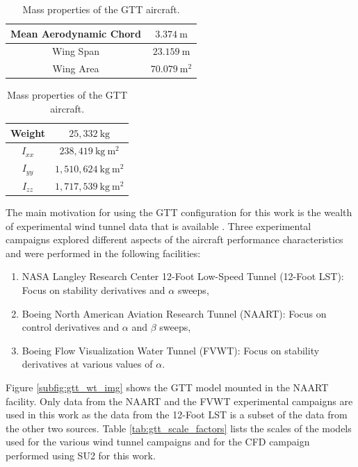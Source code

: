 \begin{table}
\parbox{0.5\textwidth}{
\centering
    \renewcommand{\arraystretch}{1.2}
    \captionsetup{justification=centering}
    \begin{tabular}{|c|c|}
        \hline
        Mean Aerodynamic Chord & $3.374~\mathrm{m}$ \\ \hline
        Wing Span & $23.159~\mathrm{m}$ \\ \hline
        Wing Area & $70.079~\mathrm{m^2}$ \\ \hline
    \end{tabular}
    \caption{Aerodynamic reference dimensions for the GTT aircraft.} 
    \label{tab:gtt_ref_dim}
}
\parbox{0.5\textwidth}{
\centering
    \renewcommand{\arraystretch}{1.2}
    \captionsetup{justification=centering}
    \begin{tabular}{|c|c|}
        \hline
        Weight & $25,332~\mathrm{kg}$ \\ \hline
        $I_{xx}$ & $238,419~\mathrm{kg~m^2}$ \\ \hline
        $I_{yy}$ & $1,510,624~\mathrm{kg~m^2}$ \\ \hline
        $I_{zz}$ & $1,717,539~\mathrm{kg~m^2}$ \\ \hline
    \end{tabular}
    \caption{Mass properties of the GTT aircraft.}
    \label{tab:gtt_mass_prop}
}
\end{table}

The main motivation for using the GTT configuration for this work is the wealth of experimental wind tunnel data that is available \cite{cunningham_preliminary_2018}. 
Three experimental campaigns explored different aspects of the aircraft performance characteristics and were performed in the following facilities:
\begin{enumerate}
    \item NASA Langley Research Center 12-Foot Low-Speed Tunnel (12-Foot LST): Focus on stability derivatives and $\alpha$ sweeps,
    \item Boeing North American Aviation Research Tunnel (NAART): Focus on control derivatives and $\alpha$ and $\beta$ sweeps,
    \item Boeing Flow Visualization Water Tunnel (FVWT): Focus on stability derivatives at various values of $\alpha$.
\end{enumerate}
Figure \ref{subfig:gtt_wt_img} shows the GTT model mounted in the NAART facility.
Only data from the NAART and the FVWT experimental campaigns are used in this work as the data from the 12-Foot LST is a subset of the data from the other two sources. 
Table \ref{tab:gtt_scale_factors} lists the scales of the models used for the various wind tunnel campaigns and for the CFD campaign performed using SU2 for this work. 

